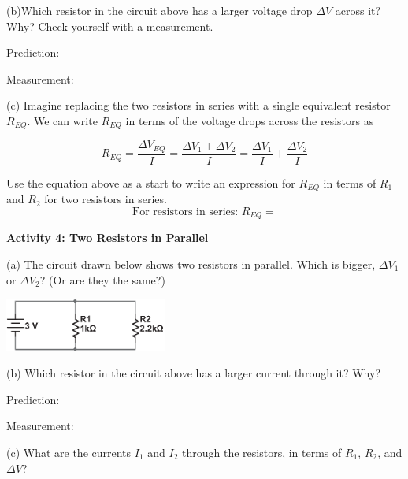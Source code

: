 (b)Which resistor in the circuit above has a larger voltage drop $\Delta V$ across it?   Why?  Check yourself with a measurement.  

\vspace{0.2 in}
\hspace{0.4 in} Prediction:
\vspace{0.2 in}

\hspace{0.4 in} Measurement:  
\vspace{0.2 in}

(c) Imagine replacing the two resistors in series with a single equivalent resistor $R_{EQ}$.  We can write $R_{EQ}$ in terms of the voltage drops across the resistors as

\begin{displaymath}
R_{EQ} = \frac{\Delta V_{EQ}}{I}= \frac{\Delta V_1 +\Delta V_2 }{I}=\frac{\Delta V_1}{I} + \frac{\Delta V_2}{I}
\end{displaymath}

Use the equation above as a start to write an expression for $R_{EQ}$ in terms of $R_1$ and $R_2$ for two resistors in series.
\begin{displaymath}
\textrm{For resistors in series: } R_{EQ} = 
\end{displaymath}

\textbf{Activity 4: Two Resistors in Parallel} \par
\nopagebreak
(a)  The circuit drawn below shows two resistors in parallel.  Which is bigger, $\Delta V_1$ or $\Delta V_2$? (Or are they the same?)

\hspace{0.5 in}\includegraphics[width=0.4\textwidth]{electric_circuits2/circ_diag5_bw.eps}
\vspace{0.2 in}

\pagebreak
(b) Which resistor in the circuit above has a larger current through it?   Why? 
 
\vspace{0.2 in}
\hspace{0.4 in} Prediction:
\answerspace{0.2 in}

\hspace{0.4 in} Measurement:  
\answerspace{0.2 in}

(c) What are the currents $I_1$ and $I_2$ through the resistors, in terms of $R_1$, $R_2$, and  $\Delta V$? 
\answerspace{0.6in}

